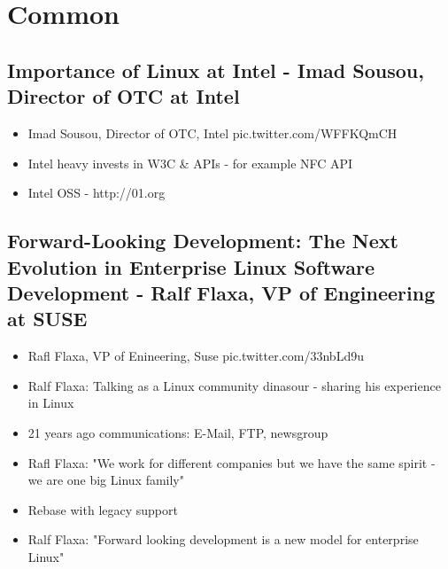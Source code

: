 \documentclass[10pt]{article}
\begin{document}
\section{Common}
\subsection{Importance of Linux at Intel - Imad Sousou, Director of OTC at Intel}
\begin{itemize}
\item Imad Sousou, Director of OTC, Intel pic.twitter.com/WFFKQmCH
\item Intel heavy invests in W3C \& APIs - for example NFC API
\item Intel OSS - http://01.org
\end{itemize}

\subsection{Forward-Looking Development: The Next Evolution in Enterprise Linux Software Development - Ralf Flaxa, VP of Engineering at SUSE}
\begin{itemize}
\item  Rafl Flaxa, VP of Enineering, Suse pic.twitter.com/33nbLd9u
\item Ralf Flaxa: Talking as a Linux community dinasour - sharing his experience in Linux 
\item  21 years ago communications: E-Mail, FTP, newsgroup
\item Rafl Flaxa: "We work for different companies but we have the same spirit - we are one big Linux family" 
\item Rebase with legacy support 
\item Ralf Flaxa: "Forward looking development is a new model for enterprise Linux" 
\end{itemize}
\end{document}
